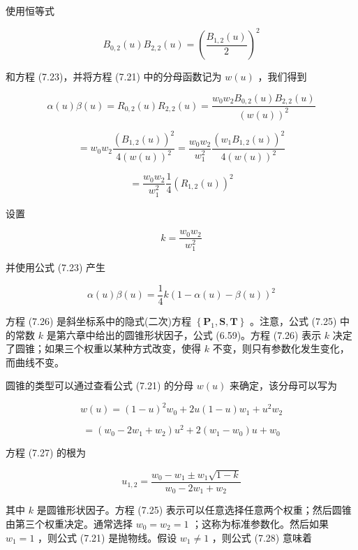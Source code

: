 \documentclass[../main.tex]{subfiles}
\begin{document}
使用恒等式

\[
{B}_{0,2}\left( u\right) {B}_{2,2}\left( u\right)  = {\left( \frac{{B}_{1,2}\left( u\right) }{2}\right) }^{2}
\]

和方程 (7.23)，并将方程 (7.21) 中的分母函数记为 \(w\left( u\right)\) ，我们得到

\[
\alpha \left( u\right) \beta \left( u\right)  = {R}_{0,2}\left( u\right) {R}_{2,2}\left( u\right)  = \frac{{w}_{0}{w}_{2}{B}_{0,2}\left( u\right) {B}_{2,2}\left( u\right) }{{\left( w\left( u\right) \right) }^{2}}
\]

\[
= {w}_{0}{w}_{2}\frac{{\left( {B}_{1,2}\left( u\right) \right) }^{2}}{4{\left( w\left( u\right) \right) }^{2}} = \frac{{w}_{0}{w}_{2}}{{w}_{1}^{2}}\frac{{\left( {w}_{1}{B}_{1,2}\left( u\right) \right) }^{2}}{4{\left( w\left( u\right) \right) }^{2}}
\]

\[
= \frac{{w}_{0}{w}_{2}}{{w}_{1}^{2}}\frac{1}{4}{\left( {R}_{1,2}\left( u\right) \right) }^{2}
\]

设置

\[
k = \frac{{w}_{0}{w}_{2}}{{w}_{1}^{2}} \tag{7.25}
\]

并使用公式 (7.23) 产生

\[
\alpha \left( u\right) \beta \left( u\right)  = \frac{1}{4}k{\left( 1 - \alpha \left( u\right)  - \beta \left( u\right) \right) }^{2} \tag{7.26}
\]

方程 (7.26) 是斜坐标系中的隐式(二次)方程 \(\left\{  {{\mathbf{P}}_{1},\mathbf{S},\mathbf{T}}\right\}\) 。注意，公式 (7.25) 中的常数 \(k\) 是第六章中给出的圆锥形状因子，公式 (6.59)。方程 (7.26) 表示 \(k\) 决定了圆锥；如果三个权重以某种方式改变，使得 \(k\) 不变，则只有参数化发生变化，而曲线不变。

圆锥的类型可以通过查看公式 (7.21) 的分母 \(w\left( u\right)\) 来确定，该分母可以写为

\[
w\left( u\right)  = {\left( 1 - u\right) }^{2}{w}_{0} + {2u}\left( {1 - u}\right) {w}_{1} + {u}^{2}{w}_{2}
\]

\[
= \left( {{w}_{0} - 2{w}_{1} + {w}_{2}}\right) {u}^{2} + 2\left( {{w}_{1} - {w}_{0}}\right) u + {w}_{0} \tag{7.27}
\]



方程 (7.27) 的根为

\[
{u}_{1,2} = \frac{{w}_{0} - {w}_{1} \pm  {w}_{1}\sqrt{1 - k}}{{w}_{0} - 2{w}_{1} + {w}_{2}} \tag{7.28}
\]

其中 \(k\) 是圆锥形状因子。方程 (7.25) 表示可以任意选择任意两个权重；然后圆锥由第三个权重决定。通常选择 \({w}_{0} = {w}_{2} = 1\) ；这称为标准参数化。然后如果 \({w}_{1} = 1\) ，则公式 (7.21) 是抛物线。假设 \({w}_{1} \neq  1\) ，则公式 (7.28) 意味着
\end{document}
